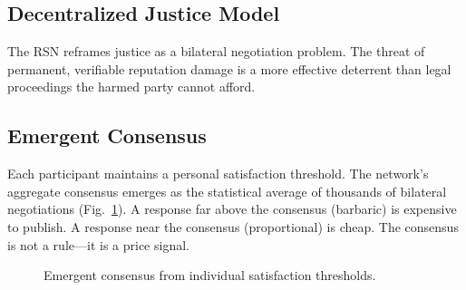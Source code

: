 \documentclass[11pt,a4paper,twocolumn]{article}
\begin{document}
\subsection{Decentralized Justice Model}

The RSN reframes justice as a bilateral negotiation problem. The threat of permanent, verifiable reputation damage is a more effective deterrent than legal proceedings the harmed party cannot afford.

\subsection{Emergent Consensus}

Each participant maintains a personal satisfaction threshold. The network's aggregate consensus emerges as the statistical average of thousands of bilateral negotiations (Fig.~\ref{fig:consensus}). A response far above the consensus (barbaric) is expensive to publish. A response near the consensus (proportional) is cheap. The consensus is not a rule---it is a price signal.

\begin{figure}[ht]
\centering
{}
\caption{Emergent consensus from individual satisfaction thresholds.}
\label{fig:consensus}
\end{figure}
\end{document}
